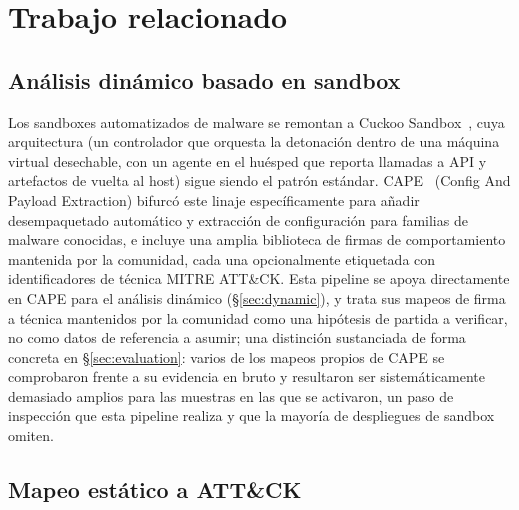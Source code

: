 \section{Trabajo relacionado}
\label{sec:related-work}

\subsection{An\'alisis din\'amico basado en sandbox}

Los sandboxes automatizados de malware se remontan a Cuckoo
Sandbox~\cite{cuckoo}, cuya arquitectura (un controlador que orquesta
la detonaci\'on dentro de una m\'aquina virtual desechable, con un
agente en el hu\'esped que reporta llamadas a API y artefactos de
vuelta al host) sigue siendo el patr\'on est\'andar. CAPE~\cite{cape}
(Config And Payload Extraction) bifurc\'o este linaje espec\'ificamente
para a\~nadir desempaquetado autom\'atico y extracci\'on de
configuraci\'on para familias de malware conocidas, e incluye una
amplia biblioteca de firmas de comportamiento mantenida por la
comunidad, cada una opcionalmente etiquetada con identificadores de
t\'ecnica MITRE ATT\&CK. Esta pipeline se apoya directamente en CAPE
para el an\'alisis din\'amico (\S\ref{sec:dynamic}), y trata sus
mapeos de firma a t\'ecnica mantenidos por la comunidad como una
hip\'otesis de partida a verificar, no como datos de referencia a
asumir; una distinci\'on sustanciada de forma concreta en
\S\ref{sec:evaluation}: varios de los mapeos propios de CAPE se
comprobaron frente a su evidencia en bruto y resultaron ser
sistem\'aticamente demasiado amplios para las muestras en las que se
activaron, un paso de inspecci\'on que esta pipeline realiza y que la
mayor\'ia de despliegues de sandbox omiten.

\subsection{Mapeo est\'atico a ATT\&CK}

